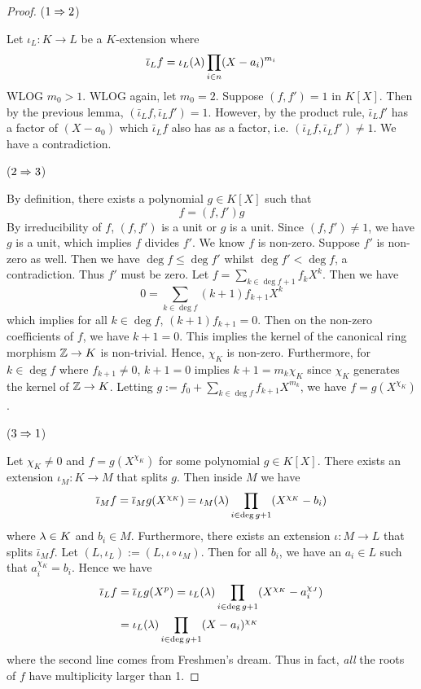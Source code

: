 \documentclass[../book.tex]{subfiles}
\begin{document}
\begin{proof}
    ($1\Rightarrow 2$)
    
        Let $\iota_L : K \to L$ be a $K$-extension where \[
            \overline{\iota}_L f = \iota_L(\lambda) \prod_{i\in n} (X - a_i)^{m_i}
        \]
        WLOG $m_0 > 1$. WLOG again, let $m_0 = 2$.
        Suppose $(f,f') = 1$ in $K[X]$. 
        Then by the previous lemma, $(\bar\iota_L f, \bar\iota_L f') = 1$. 
        However, by the product rule, $\bar\iota_L f'$ has a factor of $(X - a_0)$
        which $\bar\iota_L f$ also has as a factor, i.e.
        $(\bar\iota_L f, \bar\iota_L f') \neq 1$.
        We have a contradiction. 
    
    ($2\Rightarrow 3$)
    
        By definition, there exists a polynomial $g \in K[X]$ such that 
        \[f = (f,f') g\]
        By irreducibility of $f$, $(f,f')$ is a unit or $g$ is a unit. 
        Since $(f,f') \neq 1$, we have $g$ is a unit, 
        which implies $f$ divides $f'$.
        We know $f$ is non-zero. 
        Suppose $f'$ is non-zero as well.
        Then we have $\deg f \leq \deg f'$ whilst $\deg f' < \deg f$,
        a contradiction. 
        Thus $f'$ must be zero. 
        Let $f = \sum_{k\in\deg f + 1} f_k X^k$. 
        Then we have \[
            0 = \sum_{k\in \deg f} (k+1) f_{k+1} X^k
        \]
        which implies for all $k\in\deg f$, $(k+1) f_{k+1} = 0$.
        Then on the non-zero coefficients of $f$, we have $k+1 = 0$.
        This implies the kernel of the canonical ring morphism $\mathbb{Z} \to K$
        is non-trivial. 
        Hence, $\chi_K$ is non-zero. 
        Furthermore, for $k\in\deg f$ where $f_{k+1} \neq 0$, 
        $k+1 = 0$ implies $k+1 = m_k\chi_K$ 
        since $\chi_K$ generates the kernel of $\mathbb{Z} \to K$. 
        Letting $g := f_0 + \sum_{k\in\deg f} f_{k+1}X^{m_k}$,
        we have $f = g(X^{\chi_K})$.
        
    ($3\Rightarrow 1$)
    
        Let $\chi_K \neq 0$ and $f = g(X^{\chi_K})$
        for some polynomial $g \in K[X]$.
        There exists an extension $\iota_M : K \to M$ that splits $g$. 
        Then inside $M$ we have \[
            \overline{\iota}_M f = \overline{\iota}_M g(X^{\chi_K})
            = \iota_M(\lambda) \prod_{i\in\deg g+1} (X^{\chi_K} - b_i)
        \]
        where $\lambda \in K$ and $b_i \in M$. 
        Furthermore, there exists an extension $\iota : M \to L$ 
        that splits $\bar\iota_M f$.
        Let $(L,\iota_L) := (L,\iota\circ\iota_M)$. 
        Then for all $b_i$, we have an $a_i \in L$ such that $a_i^{\chi_K} = b_i$. 
        Hence we have \begin{align*}
            \overline{\iota}_L f &= \overline{\iota}_L g(X^p) 
            = \iota_L(\lambda) \prod_{i\in\deg g + 1}  (X^{\chi_K} - a_i^{\chi_J}) \\
            &= \iota_L(\lambda) \prod_{i\in\deg g + 1}  (X - a_i)^{\chi_K}  
        \end{align*}
        where the second line comes from Freshmen's dream. 
        Thus in fact, \emph{all} the roots of $f$ have multiplicity larger than 1. 
\end{proof}
\end{document}
